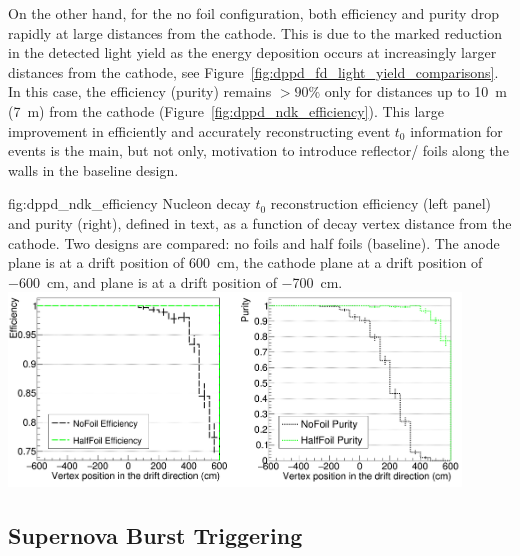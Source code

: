 On the other hand, for the no foil configuration, both efficiency and purity drop rapidly at large distances from the cathode. This is due to the marked reduction in the detected  light yield as the energy deposition occurs at increasingly larger distances from the cathode, see Figure~\ref{fig:dppd_fd_light_yield_comparisons}. In this case, the efficiency (purity) remains $>90\%$ only for distances up to \SI{10}{\m} (\SI{7}{\m}) from the cathode (Figure~\ref{fig:dppd_ndk_efficiency}). This large improvement in efficiently and accurately reconstructing event $t_0$ information for  events is the main, but not only, motivation to introduce reflector/ foils along the  walls in the baseline design.

\begin{dunefigure}{fig:dppd_ndk_efficiency}
     {Nucleon decay $t_0$ reconstruction efficiency (left panel) and purity (right), defined in text, as a function of decay vertex distance from the cathode. Two  designs are compared: no foils and half foils (baseline). The anode plane is at a drift position of \SI{+600}{\cm}, the cathode plane at a drift position of \SI{-600}{\cm},  and  plane is at a drift position of \SI{-700}{\cm}.}
    \includegraphics[width=0.90\textwidth]{graphics/dppd_ndk_efficiency.png}
    \end{dunefigure}


\subsection{Supernova Burst Triggering}
\label{subsec:dp-pds-performance_trigger}

